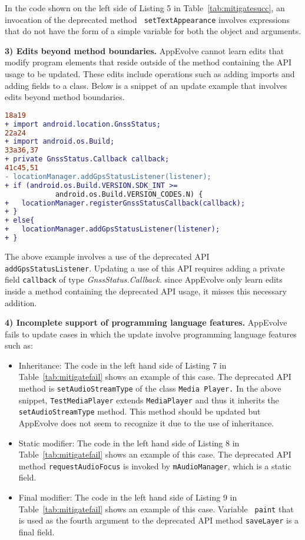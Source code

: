 In the code shown on the left side of Listing 5 in
Table~\ref{tab:mitigatesucc}, an invocation of the deprecated method {\tt
setTextAppearance} involves expressions that do not have the form
of a simple variable for both the object and arguments.

\vspace{0.25\baselineskip}\noindent\textbf{3) Edits beyond method boundaries.} AppEvolve cannot learn edits that modify program elements that reside outside of the method containing the API usage to be updated. These edits include operations such as adding imports and adding fields to a class. Below is a snippet of an update example that involves edits beyond method boundaries.
\begin{lstlisting}[language=diff,numbers=none]
18a19
+ import android.location.GnssStatus;
22a24
+ import android.os.Build;
33a36,37
+ private GnssStatus.Callback callback;
41c45,51
- locationManager.addGpsStatusListener(listener);
+ if (android.os.Build.VERSION.SDK_INT >= 
            android.os.Build.VERSION_CODES.N) {
+   locationManager.registerGnssStatusCallback(callback);
+ }
+ else{
+   locationManager.addGpsStatusListener(listener);
+ }
\end{lstlisting}
The above example involves a use of the deprecated API {\tt
addGpsStatusListener}. Updating a use of this API requires adding a private
field {\tt callback} of type {\em GnssStatus.Callback}.
since AppEvolve only learn edits inside a method containing the deprecated
API usage, it misses this necessary addition.

\vspace{0.25\baselineskip}\noindent\textbf{4) Incomplete support of programming language features.} AppEvolve fails to update cases in which the update involve programming language features such as:
\begin{itemize}
\item Inheritance: The code in the left hand side of Listing 7 in Table~\ref{tab:mitigatefail} shows an example of this case.  The deprecated API method is {\tt setAudioStreamType} of the class {\tt Media Player.} In the above snippet, {\tt TestMediaPlayer} extends {\tt MediaPlayer} and thus it inherits the {\tt setAudioStreamType} method. This method should be updated but AppEvolve does not seem to recognize it due to the use of inheritance.
\item Static modifier:  The code in the left hand side of Listing 8 in Table~\ref{tab:mitigatefail} shows an example of this case.  The deprecated API method {\tt requestAudioFocus} is invoked by {\tt mAudioManager}, which is a static field.

\item Final modifier: The code in the left hand side of Listing 9 in
Table~\ref{tab:mitigatefail} shows an example of this case.  Variable {\tt
paint} that is used as the fourth argument to the deprecated API method {\tt saveLayer} is a final field.

\end{itemize}

